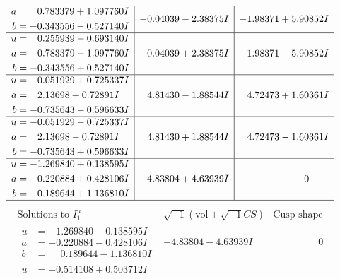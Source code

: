 \documentclass[1p]{elsarticle_modified}
\theoremstyle{definition}
\newcommand{\I}{\sqrt{-1}}
\begin{document}
$$\begin{array}{c|c|c}
\begin{aligned}
a &= \phantom{-}0.783379 + 1.097760 I \\
b &= -0.343556 - 0.527140 I\end{aligned}
 & -0.04039 - 2.38375 I & -1.98371 + 5.90852 I \\ \hline\begin{aligned}
u &= \phantom{-}0.255939 - 0.693140 I \\
a &= \phantom{-}0.783379 - 1.097760 I \\
b &= -0.343556 + 0.527140 I\end{aligned}
 & -0.04039 + 2.38375 I & -1.98371 - 5.90852 I \\ \hline\begin{aligned}
u &= -0.051929 + 0.725337 I \\
a &= \phantom{-}2.13698 + 0.72891 I \\
b &= -0.735643 - 0.596633 I\end{aligned}
 & \phantom{-}4.81430 - 1.88544 I & \phantom{-}4.72473 + 1.60361 I \\ \hline\begin{aligned}
u &= -0.051929 - 0.725337 I \\
a &= \phantom{-}2.13698 - 0.72891 I \\
b &= -0.735643 + 0.596633 I\end{aligned}
 & \phantom{-}4.81430 + 1.88544 I & \phantom{-}4.72473 - 1.60361 I \\ \hline\begin{aligned}
u &= -1.269840 + 0.138595 I \\
a &= -0.220884 + 0.428106 I \\
b &= \phantom{-}0.189644 + 1.136810 I\end{aligned}
 & -4.83804 + 4.63939 I & \phantom{-0.000000 } 0\\
 \hline 
 \end{array}$$\newpage$$\begin{array}{c|c|c}  
\text{Solutions to }I^u_{1}& \I (\text{vol} + \sqrt{-1}CS) & \text{Cusp shape}\\
 \hline 
\begin{aligned}
u &= -1.269840 - 0.138595 I \\
a &= -0.220884 - 0.428106 I \\
b &= \phantom{-}0.189644 - 1.136810 I\end{aligned}
 & -4.83804 - 4.63939 I & \phantom{-0.000000 } 0 \\ \hline\begin{aligned}
u &= -0.514108 + 0.503712 I \\

\end{aligned}
\end{array}$$
\end{document}

